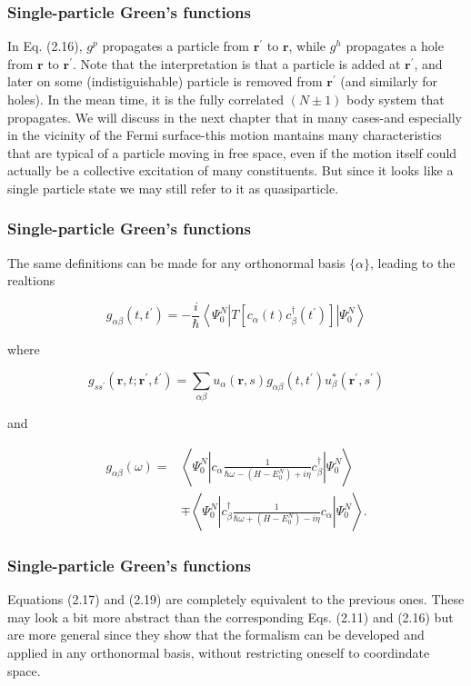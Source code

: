 \documentclass[compress]{beamer}
\begin{document}
\frame
{
\frametitle{Single-particle Green's functions}
\begin{small}
{\scriptsize
In Eq. (2.16), $g^{p}$ propagates a particle from $\mathbf{r}^{\prime}$ to $\mathbf{r}$, while $g^{h}$ propagates a hole from $\mathbf{r}$ to $\mathbf{r}^{\prime}$. Note that the interpretation is that a particle is added at $\mathbf{r}^{\prime}$, and later on some (indistiguishable) particle is removed from $\mathbf{r}^{\prime}$ (and similarly for holes). In the mean time, it is the fully correlated $(N \pm 1)$ body system that propagates. We will discuss in the next chapter that in many cases-and especially in the vicinity of the Fermi surface-this motion mantains many characteristics that are typical of a particle moving in free space, even if the motion itself could actually be a collective excitation of many constituents. But since it looks like a single particle state we may still refer to it as quasiparticle.

}
\end{small}
}
\frame
{
\frametitle{Single-particle Green's functions}
\begin{small}
{\scriptsize
The same definitions can be made for any orthonormal basis $\{\alpha\}$, leading to the realtions

$$
g_{\alpha \beta}\left(t, t^{\prime}\right)=-\frac{i}{\hbar}\left\langle\Psi_{0}^{N}\left|T\left[c_{\alpha}(t) c_{\beta}^{\dagger}\left(t^{\prime}\right)\right]\right| \Psi_{0}^{N}\right\rangle
$$

where

$$
g_{s s^{\prime}}\left(\mathbf{r}, t ; \mathbf{r}^{\prime}, t^{\prime}\right)=\sum_{\alpha \beta} u_{\alpha}(\mathbf{r}, s) g_{\alpha \beta}\left(t, t^{\prime}\right) u_{\beta}^{*}\left(\mathbf{r}^{\prime}, s^{\prime}\right)
$$

and

$$
\begin{aligned}
g_{\alpha \beta}(\omega)= & \left\langle\Psi_{0}^{N}\left|c_{\alpha} \frac{1}{\hbar \omega-\left(H-E_{0}^{N}\right)+i \eta} c_{\beta}^{\dagger}\right| \Psi_{0}^{N}\right\rangle \\
& \mp\left\langle\Psi_{0}^{N}\left|c_{\beta}^{\dagger} \frac{1}{\hbar \omega+\left(H-E_{0}^{N}\right)-i \eta} c_{\alpha}\right| \Psi_{0}^{N}\right\rangle .
\end{aligned}
$$

}
\end{small}
}


\frame
{
\frametitle{Single-particle Green's functions}
\begin{small}
{\scriptsize
Equations (2.17) and (2.19) are completely equivalent to the previous
ones. These may look a bit more abstract than the corresponding
Eqs. (2.11) and (2.16) but are more general since they show that the
formalism can be developed and applied in any orthonormal basis,
without restricting oneself to coordindate space.

}
\end{small}
}
\end{document}
